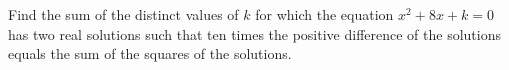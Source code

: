 Find the sum of the distinct values of $k$ for which the equation $x^2+8x+k=0$ has two real solutions such that ten times the positive difference of the solutions equals the sum of the squares of the solutions.
